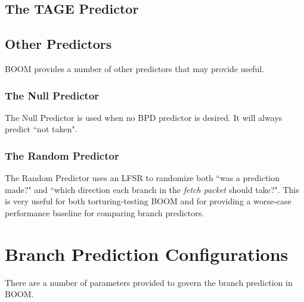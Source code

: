 \subsection{The TAGE Predictor}\label{sec:tage}


\subsection{Other Predictors}

BOOM provides a number of other predictors that may provide useful.

\subsubsection{The Null Predictor}

The Null Predictor is used when no BPD predictor is desired. It will always predict ``not taken".

\subsubsection{The Random Predictor}

The Random Predictor uses an LFSR to randomize both ``was a prediction made?" and ``which direction each branch in the {\em fetch packet} should take?".  This is very useful for both torturing-testing BOOM and for providing a worse-case performance baseline for comparing branch predictors.

\section{Branch Prediction Configurations}

There are a number of parameters provided to govern the branch prediction in BOOM.

 
